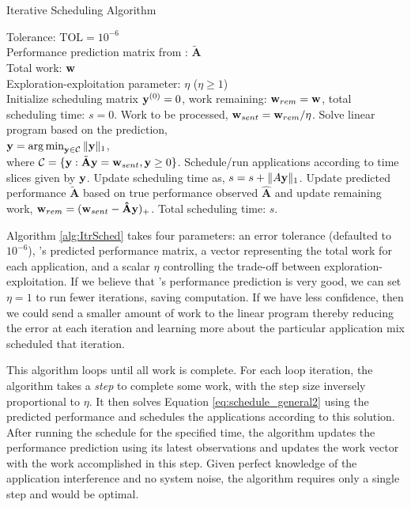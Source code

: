 \begin{algorithm}[!t]
\caption{Iterative Scheduling Algorithm}
\begin{algorithmic}[1]
\small
\REQUIRE Tolerance: $\text{TOL} = 10^{-6}$ \\
Performance prediction matrix from \SYSTEM{}: $\tilde{\mathbf{A}}$ \\
Total work: $\mathbf{w}$ \\
Exploration-exploitation parameter: $\eta$ ($\eta \geq 1$)\\
\STATE Initialize scheduling matrix $\mathbf{y}^{(0)} = 0$, work remaining: $ \mathbf{w}_{rem} = \mathbf{w}$, total scheduling time: $s = 0$.
	\STATE Work to be processed, $ \mathbf{w}_{sent} = \mathbf{w}_{rem}/\eta$.
    \STATE Solve linear program based on the prediction, \\ $\mathbf{y} = \operatorname*{arg\,min}_{\mathbf{y} \in \mathcal{C}} \|\mathbf{y}\|_1 $, \\where $ \mathcal{C} = \{ \mathbf{y}: \tilde{\mathbf{A}} \mathbf{y} = \mathbf{w}_{sent} ,\mathbf{y} \geq 0 \}$.
	\STATE Schedule/run applications according to time slices given by $\mathbf{y}$. Update scheduling time as, $s = s + \|A \mathbf{y}\|_1$.
	\STATE Update predicted performance $\mathbf{\tilde{A}}$ based on true performance observed $\mathbf{\hat{A}}$ and update remaining work,  $\mathbf{w}_{rem} = ( \mathbf{w}_{sent} -  \mathbf{\hat{A}} \mathbf{y} )_{+}$.
\ENDWHILE
\RETURN Total scheduling time: $s$.
\end{algorithmic}
\label{alg:ItrSched}
\end{algorithm}

Algorithm \ref{alg:ItrSched} takes four parameters: an error tolerance
(defaulted to $10^{-6}$), \SYSTEM's predicted performance matrix, a
vector representing the total work for each application, and a scalar
$\eta$ controlling the trade-off between exploration-exploitation. If
we believe that \SYSTEM{}'s performance prediction is very good, we
can set $\eta = 1$ to run fewer iterations, saving computation. If we
have less confidence, then we could send a smaller amount of work to
the linear program thereby reducing the error at each iteration and
learning more about the particular application mix scheduled that
iteration.

This algorithm loops until all work is complete.  For each loop
iteration, the algorithm takes a \emph{step} to complete some work,
with the step size inversely proportional to $\eta$.  It then solves
Equation \eqref{eq:schedule_general2} using the predicted performance
and schedules the applications according to this solution.  After
running the schedule for the specified time, the algorithm updates the
performance prediction using its latest observations and updates the
work vector with the work accomplished in this step.  Given perfect
knowledge of the application interference and no system noise, the
algorithm requires only a single step and would be optimal.

